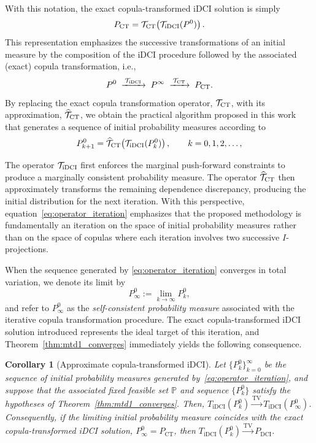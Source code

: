 \documentclass{article}
\newtheorem{corollary}{Corollary}[section]
\newcommand{\p}{\mathbb{P}}
\begin{document}
With this notation, the exact copula-transformed iDCI solution is simply
\[
P_{\rm CT}
=
\mathcal T_{\rm CT}
\!\left(
\mathcal T_{\rm iDCI}(P^0)
\right).
\]
This representation emphasizes the successive transformations of an initial measure by the composition of the iDCI procedure followed by the associated (exact) copula transformation, i.e.,
\[
P^0
\;\xrightarrow{\,\mathcal T_{\rm iDCI}\,}\;
P^\infty
\;\xrightarrow{\,\mathcal T_{\rm CT}\,}\;
P_{\rm CT}.
\]
By replacing the exact copula transformation operator, $\mathcal{T}_{\rm CT}$, with its approximation, $\widehat{\mathcal{T}}_{\rm CT}$, we obtain the practical algorithm proposed in this work that generates a sequence of initial probability measures according to
\begin{equation}
P_{k+1}^0
=
\widehat{\mathcal T}_{\rm CT}
\!\left(
\mathcal T_{\rm iDCI}(P_k^0)
\right),
\qquad
k=0,1,2,\ldots,
\label{eq:operator_iteration}
\end{equation}

The operator $\mathcal T_{\rm iDCI}$ first enforces the marginal push-forward constraints to produce a marginally consistent probability measure.
The operator $\widehat{\mathcal T}_{\rm CT}$ then approximately transforms the remaining dependence discrepancy, producing the initial distribution for the next iteration.
With this perspective, equation~\eqref{eq:operator_iteration} emphasizes that the proposed methodology is fundamentally an iteration on the space of initial probability measures rather than on the space of copulas where each iteration involves two successive $I$-projections.

When the sequence generated by
\eqref{eq:operator_iteration}
converges in total variation, we denote its limit by
\[
P^0_\infty
:=
\lim_{k\to\infty}P_k^0,
\]
and refer to $P^0_\infty$ as the \emph{self-consistent probability measure} associated with the iterative copula transformation procedure.
The exact copula-transformed iDCI solution introduced represents the ideal target of this iteration, and Theorem~\ref{thm:mtd1_converges} immediately yields the following consequence.

\begin{corollary}[Approximate copula-transformed iDCI]\label{cor:approx_cc_iDCI}
Let $\{P_k^0\}_{k=0}^\infty$ be the sequence of initial probability
measures generated by~\eqref{eq:operator_iteration}, and suppose that the
associated fixed feasible set $\p$ and sequence $\{P_k^0\}$ satisfy the
hypotheses of Theorem~\ref{thm:mtd1_converges}. Then, $T_{\mathrm{iDCI}}(P_k^0)
\xrightarrow{\mathrm{TV}}
T_{\mathrm{iDCI}}(P_\infty^0)$.
Consequently, if the limiting initial probability measure coincides with
the exact copula-transformed iDCI solution, $P_\infty^0=P_{\mathrm{CT}}$, then $T_{\mathrm{iDCI}}(P_k^0)
\xrightarrow{\mathrm{TV}}
P_{\mathrm{DCI}}$.
\end{corollary}
\end{document}
